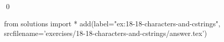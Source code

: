 
\begin{ex}
  \label{ex:18-18-characters-and-cstrings}
  
  \qed
\end{ex}
\begin{python0}
from solutions import *
add(label="ex:18-18-characters-and-cstrings",
    srcfilename='exercises/18-18-characters-and-cstrings/answer.tex')
\end{python0}
